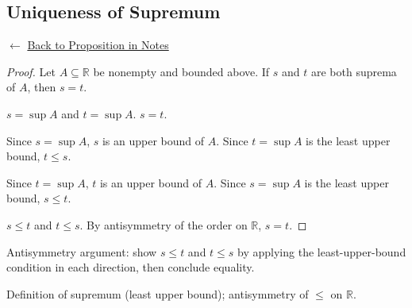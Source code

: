 
\subsection*{Uniqueness of Supremum}
\label{prf:sup-is-unique}

\begin{remark*}[Return]
$\leftarrow$ \hyperref[prop:sup-unique]{Back to Proposition in Notes}
\end{remark*}

\begin{proof}
\Claim Let $A \subseteq \mathbb{R}$ be nonempty and bounded above.
If $s$ and $t$ are both suprema of $A$, then $s = t$.

\Given $s = \sup A$ and $t = \sup A$.
\Goal $s = t$.

Since $s = \sup A$, $s$ is an upper bound of $A$.
Since $t = \sup A$ is the least upper bound, $t \le s$.

Since $t = \sup A$, $t$ is an upper bound of $A$.
Since $s = \sup A$ is the least upper bound, $s \le t$.

\Therefore $s \le t$ and $t \le s$.
By antisymmetry of the order on $\mathbb{R}$, $s = t$. \AsReq
\end{proof}

\begin{remark*}
Antisymmetry argument: show $s \le t$ and $t \le s$ by applying the
least-upper-bound condition in each direction, then conclude equality.
\end{remark*}

\begin{remark*}[Dependencies]
Definition of supremum (least upper bound); antisymmetry of $\le$ on $\mathbb{R}$.
\end{remark*}
